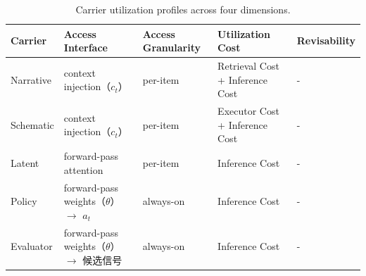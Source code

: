 
\begin{table}[htbp]
  \centering
  \caption{Carrier utilization profiles across four dimensions.}
  \label{tab:8.2}
  \small
  \renewcommand{\arraystretch}{1.5}
  \begin{tabularx}{\textwidth}{lXXXX}
    \toprule
    \textbf{Carrier} &
    \textbf{Access Interface} &
    \textbf{Access Granularity} &
    \textbf{Utilization Cost} &
    \textbf{Revisability} \\
    \midrule
    Narrative &
    context injection（$c_t$） &
    per-item &
    Retrieval Cost + Inference Cost &
    - \\
    \midrule
    Schematic &
    context injection（$c_t$） &
    per-item &
    Executor Cost + Inference Cost &
    - \\
    \midrule
    Latent &
    forward-pass attention &
    per-item &
    Inference Cost &
    - \\
    \midrule
    Policy &
    forward-pass weights（$\theta$）$\rightarrow$ $a_t$ &
    always-on &
    Inference Cost &
    - \\
    \midrule
    Evaluator &
    forward-pass weights（$\theta$）$\rightarrow$ 候选信号 &
    always-on &
    Inference Cost &
    - \\
    \bottomrule
  \end{tabularx}
\end{table}
